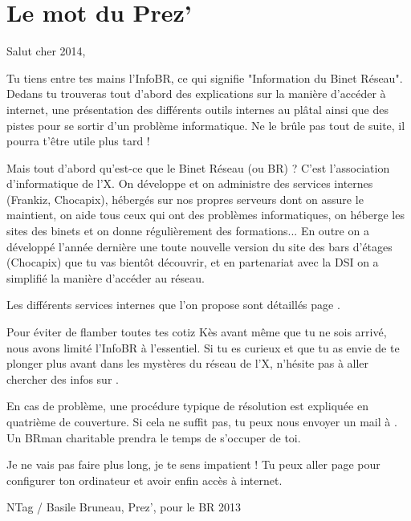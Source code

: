 \thispagestyle{empty}

\section*{Le mot du Prez'}

\vspace{1em}

Salut cher 2014,
\vspace{0.5em}

Tu tiens entre tes mains l'InfoBR, ce qui signifie "Information du Binet Réseau". Dedans tu trouveras tout d'abord des explications sur la manière d'accéder à internet, une présentation des différents outils internes au plâtal ainsi que des pistes pour se sortir d'un problème informatique. Ne le brûle pas tout de suite, il pourra t'être utile plus tard !

Mais tout d'abord qu'est-ce que le Binet Réseau (ou BR) ? C'est l'association d'informatique de l'X. On développe et on administre des services internes (Frankiz, Chocapix), hébergés sur nos propres serveurs dont on assure le maintient, on aide tous ceux qui ont des problèmes informatiques, on héberge les sites des binets et on donne régulièrement des formations... En outre on a développé l'année dernière une toute nouvelle version du site des bars d'étages (Chocapix) que tu vas bientôt découvrir, et en partenariat avec la DSI on a simplifié la manière d'accéder au réseau.

Les différents services internes que l'on propose sont détaillés page \pageref{services}. 

Pour éviter de flamber toutes tes cotiz Kès avant même que tu ne sois arrivé, nous avons limité l'InfoBR à l'essentiel. Si tu es curieux et que tu as envie de te plonger plus avant dans les mystères du réseau de l'X, n'hésite pas à aller chercher des infos sur .

\vspace{1em}
En cas de problème, une procédure typique de résolution est expliquée en quatrième de couverture. Si cela ne suffit pas, tu peux nous envoyer un mail à . Un BRman charitable prendra le temps de s'occuper de toi.

Je ne vais pas faire plus long, je te sens impatient ! Tu peux aller page \pageref{config} pour configurer ton ordinateur et avoir enfin accès à internet.

\vspace{2.5em}
\hfill NTag / Basile Bruneau, Prez', pour le BR 2013


